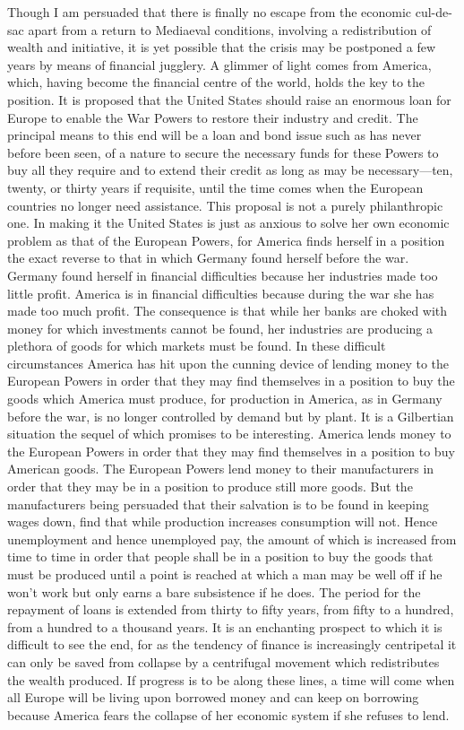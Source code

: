 \documentclass{book}
\begin{document}
Though I am persuaded that there is finally no escape from the economic cul-de-sac apart from a return to Mediaeval conditions, involving a redistribution of wealth and initiative, it is yet possible that the crisis may be postponed a few years by means of financial jugglery. A glimmer of light comes from America, which, having become the financial centre of the world, holds the key to the position. It is proposed that the United States should raise an enormous loan for Europe to enable the War Powers to restore their industry and credit. The principal means to this end will be a loan and bond issue such as has never before been seen, of a nature to secure the necessary funds for these Powers to buy all they require and to extend their credit as long as may be necessary—ten, twenty, or thirty years if requisite, until the time comes when the European countries no longer need assistance. This proposal is not a purely philanthropic one. In making it the United States is just as anxious to solve her own economic problem as that of the European Powers, for America finds herself in a position the exact reverse to that in which Germany found herself before the war. Germany found herself in financial difficulties because her industries made too little profit. America is in financial difficulties because during the war she has made too much profit. The consequence is that while her banks are choked with money for which investments cannot be found, her industries are producing a plethora of goods for which markets must be found. In these difficult circumstances America has hit upon the cunning device of lending money to the European Powers in order that they may find themselves in a position to buy the goods which America must produce, for production in America, as in Germany before the war, is no longer controlled by demand but by plant. It is a Gilbertian situation the sequel of which promises to be interesting. America lends money to the European Powers in order that they may find themselves in a position to buy American goods. The European Powers lend money to their manufacturers in order that they may be in a position to produce still more goods. But the manufacturers being persuaded that their salvation is to be found in keeping wages down, find that while production increases consumption will not. Hence unemployment and hence unemployed pay, the amount of which is increased from time to time in order that people shall be in a position to buy the goods that must be produced until a point is reached at which a man may be well off if he won’t work but only earns a bare subsistence if he does. The period for the repayment of loans is extended from thirty to fifty years, from fifty to a hundred, from a hundred to a thousand years. It is an enchanting prospect to which it is difficult to see the end, for as the tendency of finance is increasingly centripetal it can only be saved from collapse by a centrifugal movement which redistributes the wealth produced. If progress is to be along these lines, a time will come when all Europe will be living upon borrowed money and can keep on borrowing because America fears the collapse of her economic system if she refuses to lend.
\end{document}
